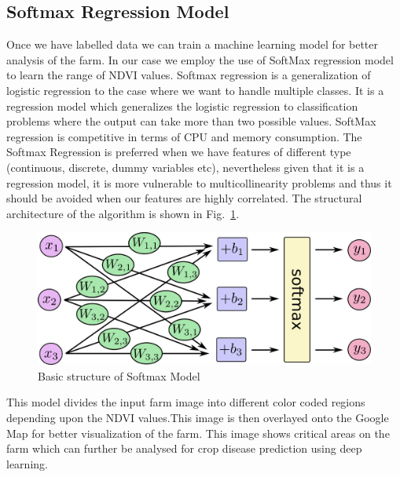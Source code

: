 \subsection{Softmax Regression Model}
Once we have  labelled data we can train a machine learning model for better analysis of the farm. In our case we employ the use of SoftMax regression model to learn the range of NDVI values. Softmax regression is a generalization of logistic regression to the case where we want to handle multiple classes. It is a regression model which generalizes the logistic regression to classification problems where the output can take more than two possible values. SoftMax regression is competitive in terms of CPU and memory consumption. The Softmax Regression is preferred when we have features of different type (continuous, discrete, dummy variables etc), nevertheless given that it is a regression model, it is more vulnerable to multicollinearity problems and thus it should be avoided when our features are highly correlated. The structural architecture of the algorithm is shown in Fig.~\ref{fig: softmax}.
\begin{figure}[t]
	\includegraphics[width=1.0\linewidth]{fin_img_11}
	\centering
	\caption{\label{fig: softmax}Basic structure of Softmax Model}
\end{figure}

This model divides the input farm image into different color coded regions depending upon the NDVI values.This image is then overlayed onto the Google Map for better visualization of the farm. This image shows critical areas on the farm which can further be analysed for crop disease prediction using deep learning.


